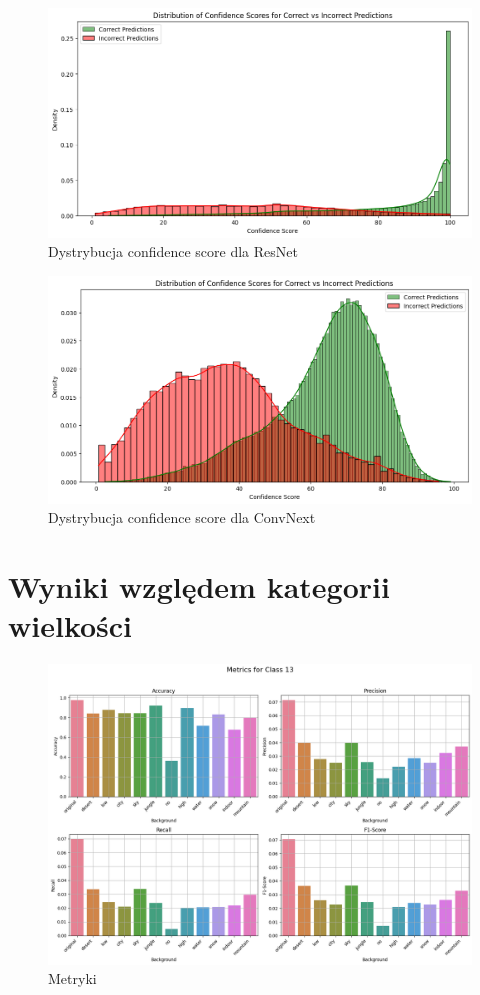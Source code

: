 \begin{figure}
	\centering\includegraphics[width=.9\textwidth]{img/resnet_conf_distro}
	\caption{Dystrybucja confidence score dla ResNet}
	\label{rys:res_c_distro}
\end{figure}

\begin{figure}
	\centering\includegraphics[width=.9\textwidth]{img/convnext_conf_distro}
	\caption{Dystrybucja confidence score dla ConvNext}
	\label{rys:conv_c_distro}
\end{figure}
\newpage
\section*{Wyniki względem kategorii wielkości}


\begin{figure}
	\centering\includegraphics[width=.9\textwidth]{img/13}
	\caption{Metryki}
	\label{rys:13}
\end{figure}

